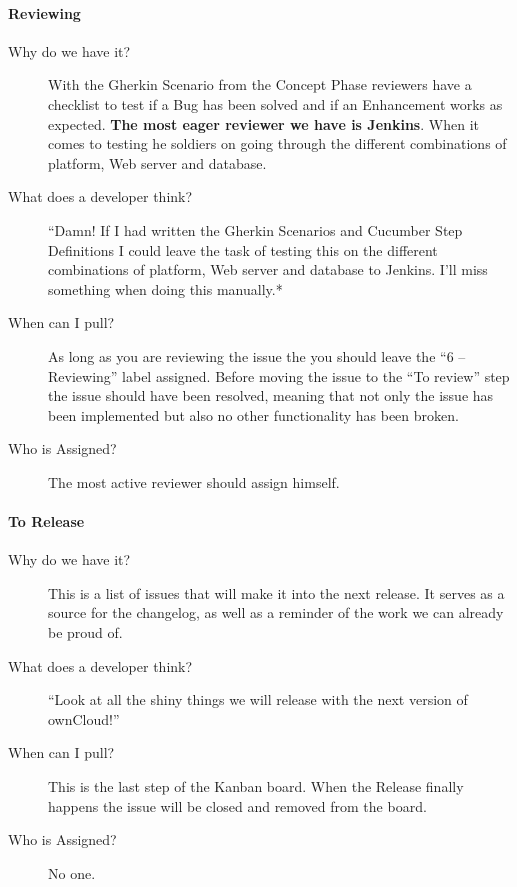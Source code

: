\documentclass[letterpaper,10pt,english]{sphinxmanual}
\begin{document}
\paragraph{Reviewing}
\label{bugtracker/kanban:reviewing}\begin{description}
\item[{Why do we have it?}] \leavevmode
With the Gherkin Scenario from the Concept Phase reviewers have a checklist to
test if a Bug has been solved and if an Enhancement works as expected. \textbf{The
most eager reviewer we have is Jenkins}. When it comes to testing he soldiers
on going through the different combinations of platform, Web server and
database.

\item[{What does a developer think?}] \leavevmode
``Damn! If I had written the Gherkin Scenarios and Cucumber Step Definitions I
could leave the task of testing this on the different combinations of platform,
Web server and database to Jenkins. I’ll miss something when doing this
manually.*

\item[{When can I pull?}] \leavevmode
As long as you are reviewing the issue the you should leave the ``6 –
Reviewing'' label assigned. Before moving the issue to the ``To review'' step the
issue should have been resolved, meaning that not only the issue has been
implemented but also no other functionality has been broken.

\item[{Who is Assigned?}] \leavevmode
The most active reviewer should assign himself.

\end{description}


\paragraph{To Release}
\label{bugtracker/kanban:to-release}\begin{description}
\item[{Why do we have it?}] \leavevmode
This is a list of issues that will make it into the next release. It serves
as a source for the changelog, as well as a reminder of the work we can already
be proud of.

\item[{What does a developer think?}] \leavevmode
``Look at all the shiny things we will release with the next version of
ownCloud!''

\item[{When can I pull?}] \leavevmode
This is the last step of the Kanban board. When the Release finally happens
the issue will be closed and removed from the board.

\item[{Who is Assigned?}] \leavevmode
No one.

\end{description}
\end{document}
